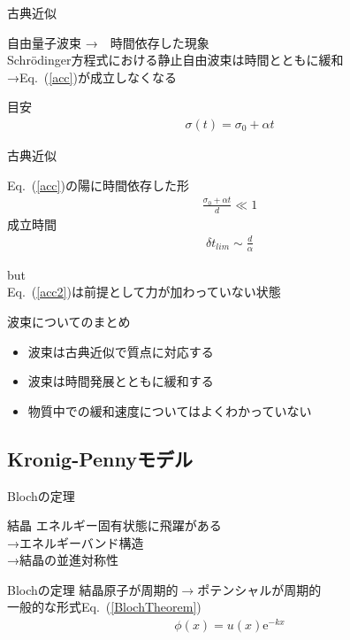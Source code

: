 \documentclass[unicode, 12pt, aspectratio=169]{beamer}
\newcommand{\eref}[1]{Eq.~(\ref{#1})}
\begin{document}
\begin{frame}{古典近似}
  \begin{block}{自由量子波束}
    →　時間依存した現象\\
    Schrödinger方程式における静止自由波束は時間とともに緩和\\
    →\eref{acc}が成立しなくなる
  \end{block}
  \begin{block}{目安}
  \begin{align}
     \sigma(t) = \sigma_0 + \alpha t\label{SD}
   \end{align}
  \end{block}
\end{frame}

\begin{frame}{古典近似}
  \begin{block}{\eref{acc}の陽に時間依存した形}
    \begin{align}
      \frac{\sigma_0 + \alpha t}{d} \ll 1
    \end{align}
    成立時間
    \begin{align}
      \delta t_{lim} \sim \frac{d}{\alpha} \label{acc2}
    \end{align}
  \end{block}
    \alert{but}\\\eref{acc2}は前提として力が加わっていない状態\\
\end{frame}

\begin{frame}{波束についてのまとめ}
      \begin{itemize}
        \item 波束は古典近似で質点に対応する
        \item 波束は時間発展とともに緩和する
        \item 物質中での緩和速度についてはよくわかっていない
      \end{itemize}
\end{frame}

\subsection{Kronig-Pennyモデル}
\frame{\insertsubsection}
\begin{frame}{Blochの定理}
  \begin{block}{結晶}
    エネルギー固有状態に飛躍がある\\
    →エネルギーバンド構造\\
    →結晶の並進対称性
  \end{block}
   \begin{block}{Blochの定理}
    結晶原子が周期的$\rightarrow$ポテンシャルが周期的\\
    一般的な形式\eref{BlochTheorem}
      \begin{align}
        \phi(x) = u(x) \mathrm{e}^{-k x} \label{BlochTheorem}
      \end{align}
   \end{block}
\end{frame}
\end{document}

